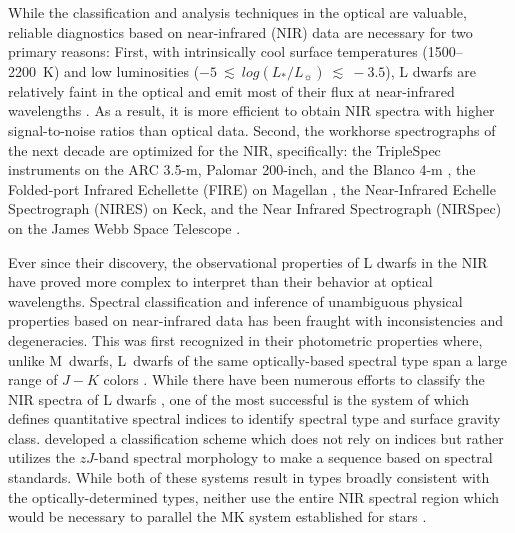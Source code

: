 \documentclass[12pt,preprint]{aastex}
\begin{document}
While the classification and analysis techniques in the optical are valuable, reliable diagnostics based on near-infrared (NIR) data are necessary for two primary reasons:
First, with intrinsically cool surface temperatures (1500--2200~K) and low luminosities ($-5~\lesssim~log(L_*/L_\sun)~\lesssim~-3.5$), L dwarfs are relatively faint in the optical and emit most of their flux at near-infrared wavelengths \citep[e.g.,][]{Filippazzo:2015dv}.
As a result, it is more efficient to obtain NIR spectra with higher signal-to-noise ratios than optical data.
Second, the workhorse spectrographs of the next decade are optimized for the NIR, specifically: the TripleSpec instruments on the ARC 3.5-m, Palomar 200-inch, and the Blanco 4-m \citep{Wilson:2004he}, the Folded-port Infrared Echellette (FIRE) on Magellan \citep{Simcoe:2013kh}, the Near-Infrared Echelle Spectrograph (NIRES) on Keck, and the Near Infrared Spectrograph (NIRSpec) on the James Webb Space Telescope \citep{Ferruit:2012em}.

Ever since their discovery, the observational properties of L dwarfs in the NIR have proved more complex to interpret than their behavior at optical wavelengths.
Spectral classification and inference of unambiguous physical properties based on near-infrared data has been fraught with inconsistencies and degeneracies.
This was first recognized in their photometric properties where, unlike M~dwarfs, L~dwarfs of the same optically-based spectral type span a large range of $J-K$ colors \citep[e.g.,][]{Leggett:2003tm}. 
While there have been numerous efforts to classify the NIR spectra of L dwarfs \citep{Reid01_NIR, Testi01, Geballe02}, one of the most successful is the system of \citet{Allers:2013hk} which defines quantitative spectral indices to identify spectral type and surface gravity class.
\citet{Kirkpatrick10} developed a classification scheme which does not rely on indices but rather utilizes the $zJ$-band spectral morphology to make a sequence based on spectral standards.
While both of these systems result in types broadly consistent with the optically-determined types, neither use the entire NIR spectral region which would be necessary to parallel the MK system established for stars \citep{Morgan:1984wy,Kirkpatrick05}.
\end{document}
